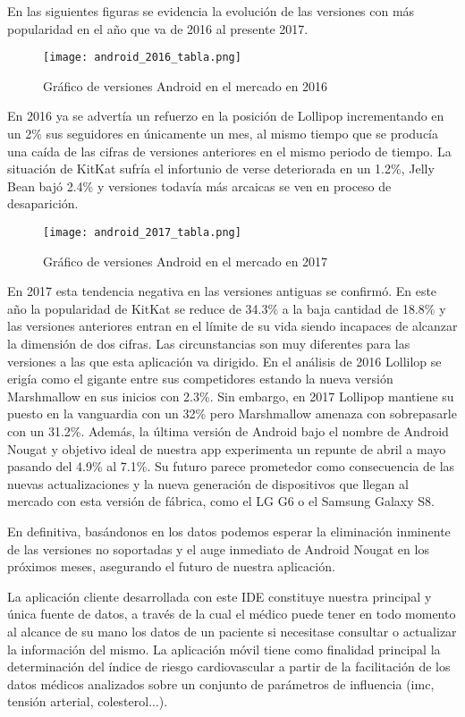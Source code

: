 \documentclass[11pt,spanish,
		listoftables,listoffigures]
		{tfgplantilla}
\begin{document}
En las siguientes figuras se evidencia la evolución de las versiones con más popularidad en el año que va de 2016 al presente 2017.

\begin{figure}[H]
\centering
\texttt{[image: android\_2016\_tabla.png]}
\caption{Gráfico de versiones Android en el mercado en 2016}
\end{figure}

En 2016 ya se advertía un refuerzo en la posición de Lollipop incrementando en un 2\%  sus seguidores en únicamente un mes, al mismo tiempo que se producía una caída de las cifras de versiones anteriores en el mismo periodo de tiempo. La situación de KitKat sufría el infortunio de verse deteriorada en un 1.2\%, Jelly Bean bajó 2.4\% y versiones todavía más arcaicas se ven en proceso de desaparición.

\newpage
\begin{figure}[H]
\centering
\texttt{[image: android\_2017\_tabla.png]}
\caption{Gráfico de versiones Android en el mercado en 2017}
\end{figure}

En 2017 esta tendencia negativa en las versiones antiguas se confirmó. En este año la popularidad de KitKat se reduce de 34.3\% a la baja cantidad de 18.8\% y las versiones anteriores entran en el límite de su vida siendo incapaces de alcanzar la dimensión de dos cifras. Las circunstancias son muy diferentes para las versiones a las que esta aplicación va dirigido. En el análisis de 2016 Lollilop se erigía como el gigante entre sus competidores estando la nueva versión Marshmallow en sus inicios con 2.3\%. Sin embargo, en 2017 Lollipop mantiene su puesto en la vanguardia con un 32\% pero Marshmallow amenaza con sobrepasarle con un 31.2\%. Además, la última versión de Android bajo el nombre de Android Nougat y objetivo ideal de nuestra app experimenta un repunte de abril a mayo pasando del 4.9\% al 7.1\%. Su futuro parece prometedor como consecuencia de las nuevas actualizaciones y la nueva generación de dispositivos que llegan al mercado con esta versión de fábrica, como el LG G6	 o el Samsung Galaxy S8.

En definitiva, basándonos en los datos podemos esperar la eliminación inminente de las versiones no soportadas y el auge inmediato de Android Nougat en los próximos meses, asegurando el futuro de nuestra aplicación.

La aplicación cliente desarrollada con este IDE constituye nuestra principal y única fuente de datos, a través de la cual el médico puede tener en todo momento al alcance de su mano los datos de un paciente si necesitase consultar o actualizar la información del mismo. La aplicación móvil tiene como finalidad principal la determinación del índice de riesgo cardiovascular a partir de la facilitación de los datos médicos analizados sobre un conjunto de parámetros de influencia (imc, tensión arterial, colesterol...).
\end{document}
